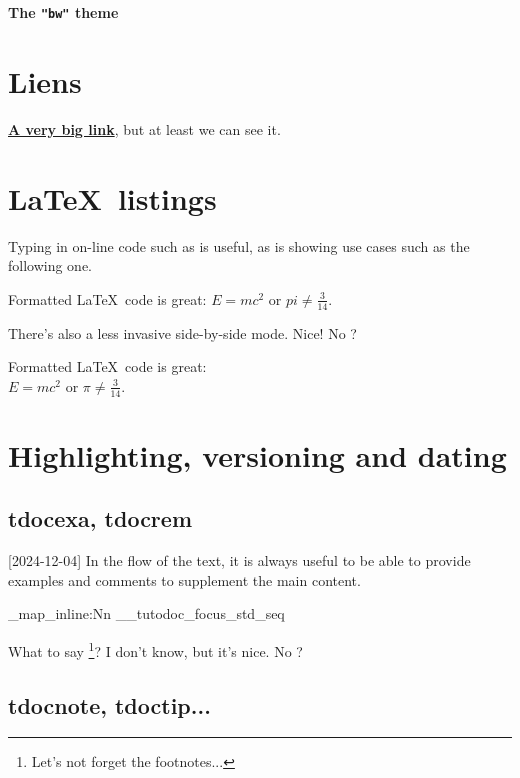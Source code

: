 \documentclass[theme = bw]{tutodoc}
\newcommand\thisstyle{bw}
\newcommand\myexrmktext{
    \tdocversion{1.7.0}[2024-12-04]
    In the flow of the text, it is always useful to be able to provide examples and comments to supplement the main content.
}
\newcommand\myhighlightedtext{
    What to say
    \footnote{
        Let's not forget the footnotes...
    }?
    I don't know, but it's nice. No ?
}
\begin{document}
\textsf{\Huge\bfseries The \texttt{"\thisstyle"} theme}

\section{Liens}

{\Large\bfseries \href{https://github.com/bc-tools/for-latex/tree/main/tutodoc}{A very big link}}, but at least we can see it.



\section{\LaTeX\ listings}

Typing in on-line code such as  is useful, as is showing use cases such as the following one.

\begin{tdoclatex}
Formatted \LaTeX\ code is great: $E = m c^2$ or $pi \neq \frac{3}{14}$.
\end{tdoclatex}


There's also a less invasive side-by-side mode. Nice! No ?

\begin{tdoclatex}[sbs]
Formatted \LaTeX\ code is great:       \\
$E = m c^2$ or $\pi \neq \frac{3}{14}$.
\end{tdoclatex}



\section{Highlighting, versioning and dating}

\subsection{tdocexa, tdocrem}

\myexrmktext

\ExplSyntaxOn

\seq_map_inline:Nn \g__tutodoc_focus_std_seq {
    \begin{tdoc#1}
        \myhighlightedtext
    \end{tdoc#1}
}

\ExplSyntaxOff



\subsection{tdocnote, tdoctip...}
\end{document}
